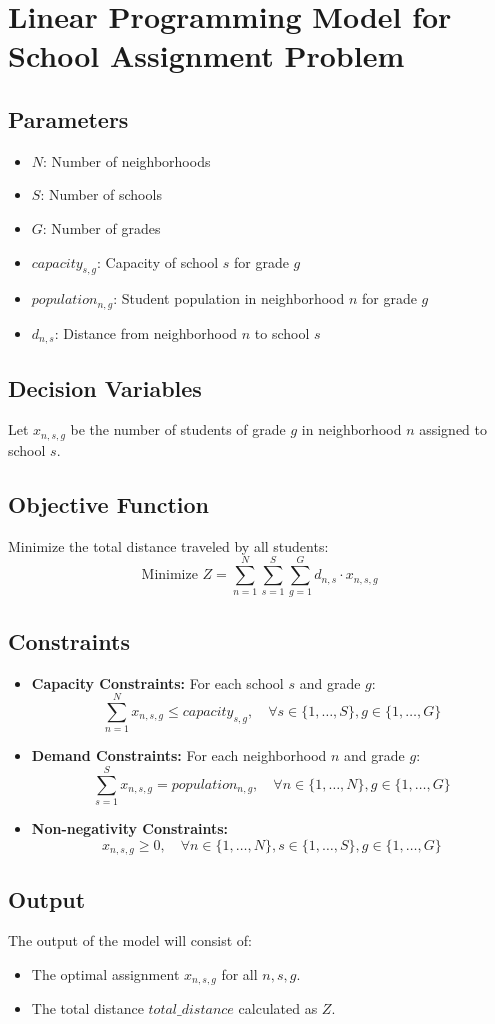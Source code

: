 \documentclass{article}
\begin{document}
\section*{Linear Programming Model for School Assignment Problem}

\subsection*{Parameters}
\begin{itemize}
    \item $N$: Number of neighborhoods
    \item $S$: Number of schools
    \item $G$: Number of grades
    \item $capacity_{s,g}$: Capacity of school $s$ for grade $g$
    \item $population_{n,g}$: Student population in neighborhood $n$ for grade $g$
    \item $d_{n,s}$: Distance from neighborhood $n$ to school $s$
\end{itemize}

\subsection*{Decision Variables}
Let \( x_{n,s,g} \) be the number of students of grade \( g \) in neighborhood \( n \) assigned to school \( s \).

\subsection*{Objective Function}
Minimize the total distance traveled by all students:
\[
\text{Minimize } Z = \sum_{n=1}^{N} \sum_{s=1}^{S} \sum_{g=1}^{G} d_{n,s} \cdot x_{n,s,g}
\]

\subsection*{Constraints}

\begin{itemize}
    \item \textbf{Capacity Constraints:} For each school \( s \) and grade \( g \):
    \[
    \sum_{n=1}^{N} x_{n,s,g} \leq capacity_{s,g}, \quad \forall s \in \{1, \ldots, S\}, g \in \{1, \ldots, G\}
    \]

    \item \textbf{Demand Constraints:} For each neighborhood \( n \) and grade \( g \):
    \[
    \sum_{s=1}^{S} x_{n,s,g} = population_{n,g}, \quad \forall n \in \{1, \ldots, N\}, g \in \{1, \ldots, G\}
    \]

    \item \textbf{Non-negativity Constraints:} 
    \[
    x_{n,s,g} \geq 0, \quad \forall n \in \{1, \ldots, N\}, s \in \{1, \ldots, S\}, g \in \{1, \ldots, G\}
    \]
\end{itemize}

\subsection*{Output}
The output of the model will consist of:
\begin{itemize}
    \item The optimal assignment \( x_{n,s,g} \) for all \( n, s, g \).
    \item The total distance \( total\_distance \) calculated as \( Z \).
\end{itemize}
\end{document}
